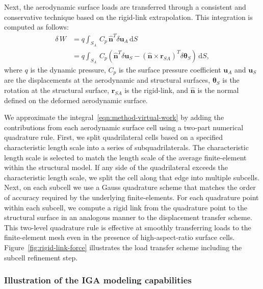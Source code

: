 \documentclass[]{aiaa-tc}
\newcommand{\mb}{\mathbf}
\newcommand{\mbs}{\boldsymbol}
\begin{document}
Next, the aerodynamic surface loads are transferred through a
consistent and conservative technique based on the rigid-link
extrapolation. This integration is computed as follows:
\begin{equation}
  \begin{aligned}
    \delta\, W & = q \int_{S_{A}} \, C_{p} \, \hat{\mb{n}}^{T} \delta\mb{u}_{A} \, \mathrm{d}S \\
    & = q\int_{S_{A}} \, C_{p} \left( \hat{\mb{n}}^{T} \delta \mathbf{u}_{S} -
    \left( \hat{\mb{n}}\times \mb{r}_{SA} \right)^{T} \delta \mbs{\theta}_{S} \right) \, \mathrm{d}S,
  \end{aligned}
  \label{eqn:method-virtual-work}
\end{equation}
where $q$ is the dynamic pressure, $C_{p}$ is the surface pressure
coefficient $\mb{u}_{A}$ and $\mb{u}_{S}$ are the displacements at the
aerodynamic and structural surfaces, $\mbs{\theta}_{S}$ is the
rotation at the structural surface, $\mb{r}_{SA}$ is the rigid-link,
and $\hat{\mb{n}}$ is the normal defined on the deformed aerodynamic
surface.

We approximate the integral~\eqref{eqn:method-virtual-work} by adding the
contributions from each aerodynamic surface cell using a two-part
numerical quadrature rule. First, we split quadrilateral cells based
on a specified characteristic length scale into a series of
subquadrilaterals. The characteristic length scale is selected to
match the length scale of the average finite-element within the
structural model. If any side of the quadrilateral exceeds the
characteristic length scale, we split the cell along that edge into
multiple subcells. Next, on each subcell we use a Gauss quadrature
scheme that matches the order of accuracy required by the underlying
finite-elements. For each quadrature point within each subcell, we
compute a rigid link from the quadrature point to the structural
surface in an analogous manner to the displacement transfer
scheme. This two-level quadrature rule is effective at smoothly
transferring loads to the finite-element mesh even in the presence of
high-aspect-ratio surface cells. Figure~\ref{fig:rigid-link-force}
illustrates the load transfer scheme including the subcell refinement
step.

\subsubsection{Illustration of the IGA modeling capabilities}

\end{document}
